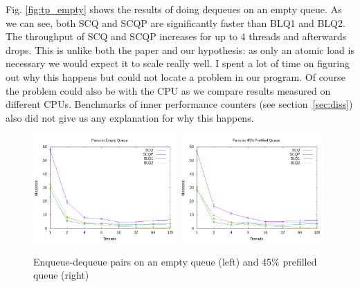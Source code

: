 \documentclass{article}      %
\begin{document}
Fig. \ref{fig:tp_empty} shows the results of doing dequeues on an empty queue. As we can see, both SCQ and SCQP are significantly faster than BLQ1 and BLQ2. The throughput of SCQ and SCQP increases for up to 4 threads and afterwards drops. This is unlike both the paper and our hypothesis: as only an atomic load is necessary we would expect it to scale really well. I spent a lot of time on figuring out why this happens but could not locate a problem in our program. Of course the problem could also be with the CPU as we compare results measured on different CPUs. Benchmarks of inner performance counters (see section~\ref{sec:diss}) also did not give us any explanation for why this happens.

\begin{figure}[hbtp]
	\centering
	\includegraphics[width=0.49\textwidth]{Pictures/tp_pairs_empty.png}
	\includegraphics[width=0.49\textwidth]{Pictures/tp_pairs_90.png}
	\caption{Enqueue-dequeue pairs on an empty queue (left) and 45\% prefilled queue (right)}
	\label{fig:tp_pairs}
\end{figure}
\end{document}
